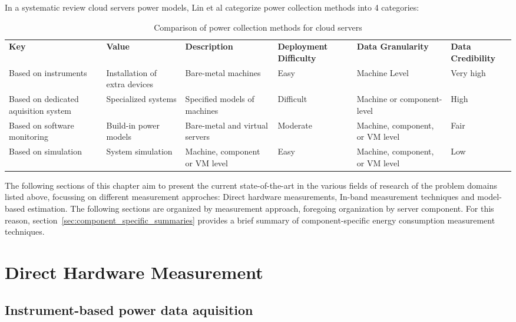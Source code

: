 In a systematic review cloud servers power models, Lin et al\parencite{lin2020taxonomy} categorize power collection methods into 4 categories:
\begin{table}[h]
    \tiny
    \begin{tabular}{ |p{2cm} | p{2cm} | p{2.5cm} | p{1.2cm} | p{2cm} | p{1.5cm} |} 
        \hline
        \textbf{Key} & \textbf{Value} & \textbf{Description} & \textbf{Deployment Difficulty} & \textbf{Data Granularity} & \textbf{Data Credibility}\\
        \Xhline{1.5pt}
        Based on instruments & Installation of extra devices & Bare-metal machines & Easy & Machine Level & Very high \\
        \hline
        Based on dedicated aquisition system & Specialized systems & Specified models of machines & Difficult & Machine or component-level & High \\
        \hline
        Based on software monitoring & Build-in power models & Bare-metal and virtual servers & Moderate & Machine, component, or VM level & Fair \\
        \hline
        Based on simulation & System simulation & Machine, component or VM level & Easy & Machine, component, or VM level & Low\\
        \hline
    \end{tabular}
    \caption[Comparison of power collection methods for cloud servers]{Comparison of power collection methods for cloud servers}
    \label{tab:power_collection_methods}
\end{table}

The following sections of this chapter aim to present the current state-of-the-art in the various fields of research of the problem domains listed above, focussing on different measurement approches: Direct hardware measurements, In-band measurement techniques and model-based estimation. The following sections are organized by measurement approach, foregoing organization by server component. For this reason, section~\ref{sec:component_specific_summaries} provides a brief summary of component-specific energy consumption measurement techniques.

\section{Direct Hardware Measurement}

\subsection{Instrument-based power data aquisition}

